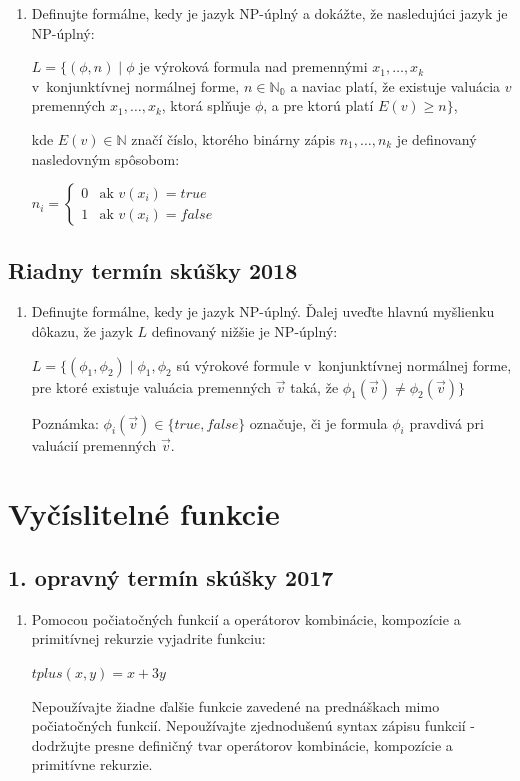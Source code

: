 \documentclass[11pt,a4paper]{article}
\begin{document}
		\begin{enumerate}
			\item Definujte formálne, kedy je jazyk NP-úplný a dokážte, že nasledujúci jazyk je NP-úplný:

			$L = \{(\phi, n) \mid \phi$ je výroková formula nad premennými $x_1, \ldots, x_k$ v~konjunktívnej normálnej forme, $n \in \mathbb{N_0}$ a naviac platí, že existuje valuácia $v$ premenných $x_1, \ldots, x_k$, ktorá splňuje $\phi$, a pre ktorú platí $E(v) \geq n\}$,
	
			kde $E(v) \in \mathbb{N}$ značí číslo, ktorého binárny zápis $n_1, \ldots, n_k$ je definovaný nasledovným spôsobom:
	
			$n_i =
			\left\{
			\begin{array}{ll}
				0  & \mbox{ak } v(x_i) = true \\
				1 & \mbox{ak } v(x_i) = false
			\end{array}
			\right.$
		\end{enumerate}	

		\subsection{Riadny termín skúšky 2018}

		\begin{enumerate}
			\item Definujte formálne, kedy je jazyk NP-úplný. Ďalej uveďte hlavnú myšlienku dôkazu, že jazyk $L$ definovaný nižšie je NP-úplný:

			$L = \{(\phi_1, \phi_2) \mid \phi_1, \phi_2$ sú výrokové formule v~konjunktívnej normálnej forme, pre ktoré existuje valuácia premenných $\vec{v}$ taká, že $\phi_1(\vec{v}) \neq \phi_2(\vec{v})\}$
	
			Poznámka: $\phi_i(\vec{v}) \in \{true, false\}$ označuje, či je formula $\phi_i$ pravdivá pri valuácií premenných $\vec{v}$.
		\end{enumerate}	

	\section{Vyčíslitelné funkcie}

		\subsection{1. opravný termín skúšky 2017}

		\begin{enumerate}
			\item Pomocou počiatočných funkcií a operátorov kombinácie, kompozície a primitívnej rekurzie vyjadrite funkciu:

			$tplus(x,y) = x + 3y$
	
			Nepoužívajte žiadne ďalšie funkcie zavedené na prednáškach mimo počiatočných funkcií. Nepoužívajte zjednodušenú syntax zápisu funkcií \-- dodržujte presne definičný tvar operátorov kombinácie, kompozície a primitívne rekurzie.
		\end{enumerate}	
\end{document}
